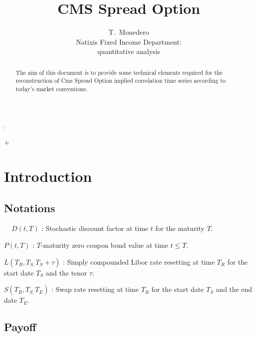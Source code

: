 \documentclass[3pt]{article}
\begin{document}
\title{CMS Spread Option}
\author{T.\ Monedero \\
Natixis Fixed Income Department:\\
quantitative analysis }
\maketitle

\begin{abstract}
The aim of this document is to provide some technical elements required for
the reconstruction of Cms Spread Option implied correlation time series
according to today's market conventions.
\end{abstract}

\tableofcontents

.

\bigskip

\bigskip

\bigskip

\bigskip

\bigskip

\bigskip +

\bigskip

\bigskip

\bigskip

\bigskip

\bigskip

\section{Introduction}

\subsection{Notations}

$\ \ \ \ \ D(t,T)$ : Stochastic discount factor at time $t$ for the maturity 
$T$.

\bigskip

$P(t,T)$ : $T$-maturity zero coupon bond value at time $t\leq T$.

\bigskip

$L(T_{R},T_{S,}T_{S}+\tau )$ : Simply compounded Libor rate resetting at
time $T_{R}$ for the start date $T_{S}$ and the tenor $\tau $.

\bigskip

$S(T_{R},T_{S,}T_{E})$ : Swap rate resetting at time $T_{R}$ for the start
date $T_{S}$ and the end date $T_{E}$.

\subsection{Payoff}
\end{document}
